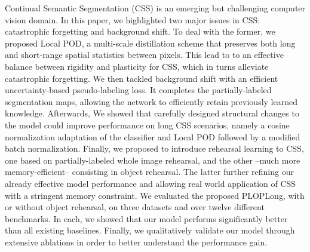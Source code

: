 Continual Semantic Segmentation (\ac{CSS}) is an emerging but challenging computer vision domain. In this
paper, we highlighted two major issues in \ac{CSS}: catastrophic forgetting and background shift. To deal
with the former, we proposed Local POD, a multi-scale distillation scheme that preserves both long
and short-range spatial statistics between pixels. This lead to to an effective balance between
rigidity and plasticity for \ac{CSS}, which in turns alleviate catastrophic forgetting. We then tackled
background shift with an efficient uncertainty-based pseudo-labeling loss. It completes the
partially-labeled segmentation maps, allowing the network to efficiently retain previously learned
knowledge. Afterwards, We showed that carefully designed structural changes to the model could
improve performance on long \ac{CSS} scenarios, namely a cosine normalization adaptation of the
classifier and Local POD followed by a modified batch normalization. Finally, we proposed to
introduce rehearsal learning to \ac{CSS}, one based on partially-labeled whole image rehearsal, and the
other --much more memory-efficient-- consisting in object rehearsal. The latter further refining our
already effective model performance and allowing real world application of \ac{CSS} with a stringent
memory constraint. We evaluated the proposed PLOPLong, with or without object rehearsal, on three
datasets and over twelve different benchmarks. In each, we showed that our model performs
significantly better than all existing baselines. Finally, we qualitatively validate our model
through extensive ablations in order to better understand the performance gain.
